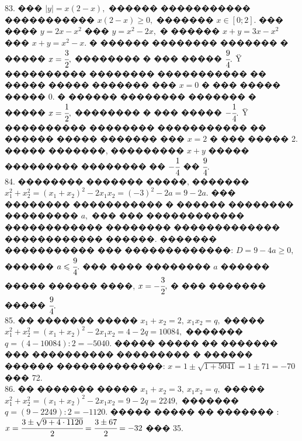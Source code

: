 \documentclass[12pt]{article}
\begin{document}
83.  ��� $|y|=x(2-x),$ ������ ����������� ����������� $x(2-x)\geqslant0,$ ������� $x\in[0;2].$ ��� ���� $y=2x-x^2$ ��� $y=x^2-2x,$ � ������ $x+y=3x-x^2$ ��� $x+y=x^2-x.$ � ������ �������� ������� � ����� $x=\cfrac{3}{2},$ �������� � ��� ����� $\cfrac{9}{4}.$ Ÿ ���������� �������� ����������� �� ����� ����� ������� ��� $x=0$ � ��� ����� ����� 0. � ������ �������� ������� � ����� $x=\cfrac{1}{2},$ �������� � ��� ����� $-\cfrac{1}{4}.$ Ÿ ���������� �������� ����������� �� ������ ����� ������� ��� $x=2$ � ��� ����� 2. ����� �������, ��������� $x+y$ ����� ��������� �������� �� $-\cfrac{1}{4}$ �� $\cfrac{9}{4}.$\\
84. �������� ������� �����, ������� $x_1^2+x_2^2=(x_1+x_2)^2-2x_1x_2=(-3)^2-2a=9-2a.$ ��� �������� ����������� � ������ �������� ��������� $a,$ ��� ��� ������������ ������������ �������� ������������� ������������ ������. ������� ����������� ��� �������������: $D=9-4a\geqslant0,$ ������ $a\leqslant \cfrac{9}{4}.$ ��� ���� �������� $a$ ������ ����� ������ ����, $x=-\cfrac{3}{2},$ � ��� ������� ����� $\cfrac{9}{4}.$\\
85. �� ������� ����� $x_1+x_2=2,\ x_1x_2=q,$ ����� $x_1^2+x_2^2=(x_1+x_2)^2-2x_1x_2=4-2q=10084,$ ������� $q=(4-10084):2=-5040.$ ����� ����� �� ������� ��� ���������� ��������� � ������ ������ �������������: $x=1\pm\sqrt{1+5041}=1\pm71=-70$ ��� 72.\\
86. �� ������� ����� $x_1+x_2=3,\ x_1x_2=q,$ ����� $x_1^2+x_2^2=(x_1+x_2)^2-2x_1x_2=9-2q=2249,$ ������� $q=(9-2249):2=-1120.$ ����� ����� �� ������� : $x=\cfrac{3\pm\sqrt{9+4\cdot1120}}{2}=\cfrac{3\pm67}{2}=-32$ ��� 35.\\
\end{document}

